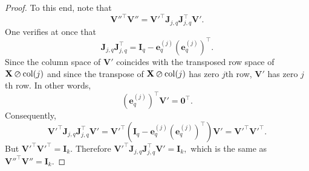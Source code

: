 \documentclass[11pt,a4paper]{article}
\theoremstyle{break}
\numberwithin{dummy}{section}
\theoremstyle{plain}
\theoremstyle{plain}
\theoremstyle{plain}
\theoremstyle{plain}
\theoremstyle{plain}
\theoremstyle{MyNonumberplain}
\newtheorem{proof}{Proof}
\newcommand{\0}{\M{0}}
\newcommand{\M}[1]{\mathbf{#1}}
\newcommand{\T}{\top}
\newcommand{\eve}[2]{\mathbf{e}^{(#1)}_{#2}}
\newcommand{\sel}[2]{\M{J}_{#1,#2}}
\newcommand{\zercol}[2]{\M{#1} \varoslash \mathrm{col}(#2)}
\begin{document}
\begin{proof}
  To this end, note that
  \begin{displaymath}
    \M{V}''^\T  \M{V}'' = \M{V}'^\T \sel{j}{q} \sel{j}{q}^\T \M{V}'.
  \end{displaymath}
  One verifies at once that
  \begin{displaymath}
    \sel{j}{q} \sel{j}{q}^\T = \M{I}_q -  \eve{j}{q} (\eve{j}{q})^\T.
  \end{displaymath}
  Since the column space of $\M{V}'$ coincides with the transposed row space of $\zercol{X}{j}$ and since the transpose of $\zercol{X}{j}$ has zero $j$th row, $\M{V}'$ has zero $j$th row. In other words,
  \begin{displaymath}
    (\eve{j}{q})^\T \M{V}' = \0^\T.
  \end{displaymath}
  Consequently,
  \begin{displaymath}
    \M{V}'^\T \sel{j}{q} \sel{j}{q}^\T \M{V}'
    =
    \M{V}'^\T (\M{I}_q -  \eve{j}{q} (\eve{j}{q})^\T) \M{V}'
    =
    \M{V}'^\T \M{V}'^\T.
  \end{displaymath}
  But
  \begin{math}
    \M{V}'^\T \M{V}'^\T = \M{I}_k.
  \end{math}
  Therefore
  \begin{math}
    \M{V}'^\T \sel{j}{q} \sel{j}{q}^\T \M{V}' = \M{I}_k,
  \end{math}
  which is the same as
  \begin{math}
    \M{V}''^\T \M{V}'' = \M{I}_k.
  \end{math}
\end{proof}
\end{document}
